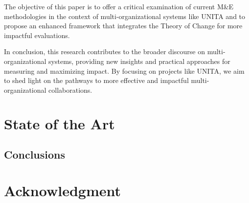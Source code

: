 \documentclass[conference]{IEEEtran}
\begin{document}
The objective of this paper is to offer a critical examination of current M\&E methodologies in the context of multi-organizational systems like UNITA and to propose an enhanced framework that integrates the Theory of Change for more impactful evaluations.

In conclusion, this research contributes to the broader discourse on multi-organizational systems, providing new insights and practical approaches for measuring and maximizing impact. By focusing on projects like UNITA, we aim to shed light on the pathways to more effective and impactful multi-organizational collaborations.

\section{State of the Art}
\label{soa}


\subsection{Conclusions}

\section*{Acknowledgment}
\vspace{12pt}


\end{document}
